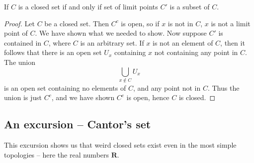 \begin{exercise}
    If $C$ is a closed set if and only if set of limit points $C'$  is a subset of $C$.
\end{exercise}
\begin{proof}
    Let $C$ be a closed set. Then $C^c$ is open, so if $x$ is not in $C$, $x$ is not a limit point of $C$. We have shown what we needed to show. Now suppose $C'$ is contained in $C$, where $C$ is an arbitrary set. If $x$ is not an element of $C$, then it follows that there is an open set $U_x$ containing $x$ not containing any point in $C$. The union
    \[ \bigcup_{x \notin C} U_x \]
    is an open set containing no elements of $C$, and any point not in $C$. Thus the union is just $C^c$, and we have shown $C^c$ is open, hence $C$ is closed.
\end{proof}

\subsection{An excursion -- Cantor's set}

This excursion shows us that weird closed sets exist even in the most simple topologies -- here the real numbers $\mathbf{R}$.

